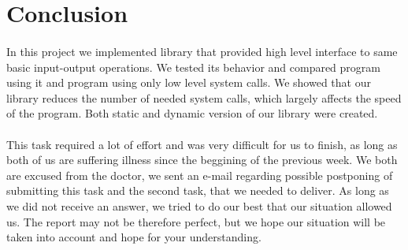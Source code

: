 \documentclass[a4paper,10pt]{article}
\begin{document}
\newpage


\section{Conclusion}
\paragraph{}
In this project we implemented library that provided high level interface to same basic input-output operations. We tested its behavior and compared program using it and program using only low level system calls. We showed that our library reduces the number of needed system calls, which largely affects the speed of the program. Both static and dynamic version of our library were created. 
\paragraph{} 
This task required a lot of effort and was very difficult for us to finish, as long as both of us are suffering illness since the beggining of the previous week. We both are excused from the doctor, we sent an e-mail regarding possible postponing of submitting this task and the second task, that we needed to deliver. As long as we did not receive an answer, we tried to do our best that our situation allowed us. The report may not be therefore perfect, but we hope our situation will be taken into account and hope for your understanding.

 
\end{document}
